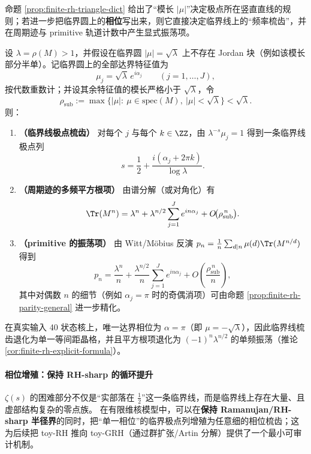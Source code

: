 \begin{remark}[零点—振荡字典：临界圆谱 \texorpdfstring{$\Rightarrow$}{=>} 临界线梳齿与多频平方根项]\label{rem:finite-rh-zero-oscillation-dict}
命题 \ref{prop:finite-rh-triangle-dict} 给出了“模长 \(|\mu|\)”决定极点所在竖直直线的规则；若进一步把临界圆上的\textbf{相位}写出来，则它直接决定临界线上的“频率梳齿”，并在周期迹与 primitive 轨道计数中产生显式振荡项。
\par
设 \(\lambda=\rho(M)>1\)，并假设在临界圆 \(|\mu|=\sqrt{\lambda}\) 上不存在 Jordan 块（例如该模长部分半单）。记临界圆上的全部达界特征值为
\[
\mu_j=\sqrt{\lambda}\,e^{i\alpha_j}\qquad(j=1,\dots,J),
\]
按代数重数计；并设其余特征值的模长严格小于 \(\sqrt{\lambda}\)，令
\[
\rho_{\mathrm{sub}}:=\max\{|\mu|:\ \mu\in\mathrm{spec}(M),\ |\mu|<\sqrt{\lambda}\}<\sqrt{\lambda}.
\]
则：
\begin{enumerate}
  \item \textbf{（临界线极点梳齿）} 对每个 \(j\) 与每个 \(k\in\ZZ\)，由 \(\lambda^{-s}\mu_j=1\) 得到一条临界线极点列
  \[
  s=\frac12+\frac{i(\alpha_j+2\pi k)}{\log\lambda}.
  \]
  \item \textbf{（周期迹的多频平方根项）} 由谱分解（或对角化）有
  \[
  \Tr(M^n)=\lambda^n+\lambda^{n/2}\sum_{j=1}^{J}e^{in\alpha_j}+O\!\bigl(\rho_{\mathrm{sub}}^{\,n}\bigr).
  \]
  \item \textbf{（primitive 的振荡项）} 由 Witt/Möbius 反演
  \(p_n=\frac{1}{n}\sum_{d\mid n}\mu(d)\Tr(M^{n/d})\)
  得到
  \[
  p_n=\frac{\lambda^n}{n}+\frac{\lambda^{n/2}}{n}\sum_{j=1}^{J}e^{in\alpha_j}
  +O\!\left(\frac{\rho_{\mathrm{sub}}^{\,n}}{n}\right),
  \]
  其中对偶数 \(n\) 的细节（例如 \(\alpha_j=\pi\) 时的奇偶消项）可由命题 \ref{prop:finite-rh-parity-general} 进一步精化。
\end{enumerate}
在真实输入 40 状态核上，唯一达界相位为 \(\alpha=\pi\)（即 \(\mu=-\sqrt{\lambda}\)），因此临界线梳齿退化为单一等间距晶格，并且平方根项退化为 \(({-}1)^n\lambda^{n/2}\) 的单频振荡（推论 \ref{cor:finite-rh-explicit-formula}）。
\end{remark}

\paragraph{相位增殖：保持 RH-sharp 的循环提升}
\(\zeta(s)\) 的困难部分不仅是“实部落在 \(\tfrac12\)”这一条临界线，而是临界线上存在大量、且虚部结构复杂的零点族。
在有限维核模型中，可以在\textbf{保持 Ramanujan/RH-sharp 半径界}的同时，把“单一相位”的临界极点列增殖为任意细的相位梳齿；这为后续把 toy-RH 推向 toy-GRH（通过群扩张/Artin 分解）提供了一个最小可审计机制。

